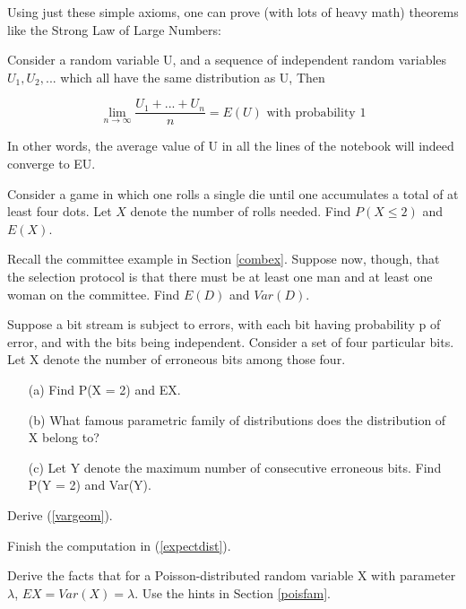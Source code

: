 Using just these simple axioms, one can prove (with lots of heavy math)
theorems like the Strong Law of Large Numbers:

\begin{theorem}
Consider a random variable U, and a sequence of independent random
variables $U_1, U_2, ...$ which all have the same distribution as U,
Then

\begin{equation}
\label{slln}
\lim_{n \rightarrow \infty} \frac{U_1+...+U_n}{n} = E(U) \textrm{ with
probability 1}
\end{equation}
\end{theorem}

In other words, the average value of U in all the lines of the notebook
will indeed converge to EU.

\startproblemset

\oneproblem
Consider a game in which one rolls a single die until one accumulates a
total of at least four dots. Let $X$ denote the number of rolls needed.
Find $P(X \leq 2)$ and $E(X)$.

\oneproblem
Recall the committee example in Section \ref{combex}.  Suppose now,
though, that the selection protocol is that there must be at least one
man and at least one woman on the committee.  Find $E(D)$ and $Var(D)$.

\oneproblem
Suppose a bit stream is subject to errors, with each bit having
probability p of error, and with the bits being independent. Consider a
set of four particular bits. Let X denote the number of erroneous bits
among those four.

\begin{itemize}

\item [(a)] Find P(X = 2) and EX.

\item [(b)] What famous parametric family of distributions does the
distribution of X belong to?

\item [(c)] Let Y denote the maximum number of consecutive erroneous bits.
Find P(Y = 2) and Var(Y). 

\end{itemize}

\oneproblem
Derive (\ref{vargeom}).

\oneproblem
Finish the computation in (\ref{expectdist}).

\oneproblem
Derive the facts that for a Poisson-distributed random variable X with
parameter $\lambda$, $EX = Var(X) = \lambda$.  Use the hints in Section
\ref{poisfam}.

